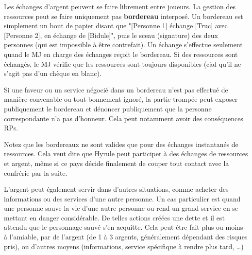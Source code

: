 {{		\par Les échanges d'argent peuvent se faire librement entre joueurs. La gestion des ressources peut se faire uniquement pas \textbf{bordereau} interposé. Un bordereau est simplement un bout de papier disant que "[Personne 1] échange [Truc] avec [Personne 2], en échange de [Bidule]", puis le sceau (signature) des deux personnes (qui est impossible à être contrefait). Un échange s'effectue seulement quand le MJ en charge des échanges reçoit le bordereau. Si des ressources sont échangés, le MJ vérifie que les ressources sont toujours disponibles (càd qu'il ne s'agit pas d'un chèque en blanc).
		
		\par Si une faveur ou un service négocié dans un bordereau n'est pas effectué de manière convenable ou tout bonnement ignoré, la partie trompée peut exposer publiquement le bordereau et dénoncer publiquement que la personne correspondante n'a pas d'honneur. Cela peut notamment avoir des conséquences RPs.
		
		\par Notez que les bordereaux ne sont valides que pour des échanges instantanés de ressources. Cela veut dire que Hyrule peut participer à des échanges de ressources et argent, même si ce pays décide finalement de couper tout contact avec la confrérie par la suite.
		
		\par L'argent peut également servir dans d'autres situations, comme acheter des informations ou des services d'une autre personne. Un cas particulier est quand une personne sauve la vie d'une autre personne ou rend un grand service en se mettant en danger considérable. De telles actions créées une dette et il est attendu que le personnage sauvé s'en acquitte. Cela peut être fait plus ou moins à l'amiable, par de l'argent (de 1 à 3 argents, généralement dépendant des risques pris), ou d'autres moyens (informations, service spécifique à rendre plus tard, \dots)
	}
}



